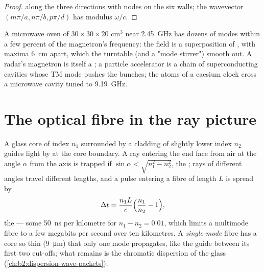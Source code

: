 \begin{proof}
 along the three directions with nodes on the six walls;
the wavevector $(m\pi/a, n\pi/b, p\pi/d)$ has modulus $\omega/c$.
\end{proof}

\begin{example}\label{ex:b2:guided-waves:cavities}
A microwave oven of $30 \times 30 \times 20$ cm$^3$ near \qty{2.45}{GHz} has
dozens of modes within a few percent of the magnetron's frequency:
the field is a superposition of , with maxima
\qty{6}{cm} apart, which the turntable (and a "mode stirrer") smooth
out. A radar's magnetron is itself a ; a particle
accelerator is a chain of superconducting cavities whose TM mode
pushes the bunches; the atoms of a caesium clock cross a microwave
cavity tuned to \qty{9.19}{GHz}.
\end{example}

\section{The optical fibre in the ray picture}

\begin{proposition}\label{prop:b2:guided-waves:fibre}
A glass core of index $n_1$ surrounded by a cladding of slightly lower
index $n_2$ guides light by  at the core
boundary. A ray entering the end face from air at the angle $\alpha$ from
the axis is trapped if $\sin\alpha < \sqrt{n_1^2 - n_2^2}$, the \emph{}; rays of different angles travel different lengths, and a
pulse entering a fibre of length $L$ is spread by
\[
\Delta t = \frac{n_1L}c\Bigl(\frac{n_1}{n_2} - 1\Bigr) ,
\]
the \emph{} --- some \qty{50}{ns} per kilometre for $n_1
- n_2 = 0.01$, which limits a multimode fibre to a few megabits per
second over ten kilometres. A \emph{single-mode} fibre has a core so
thin (\qty{9}{\micro m}) that only one mode propagates, like the guide
between its first two cut-offs; what remains is the chromatic
dispersion of the glass (\cref{ch:b2:dispersion-wave-packets}).
\end{proposition}

